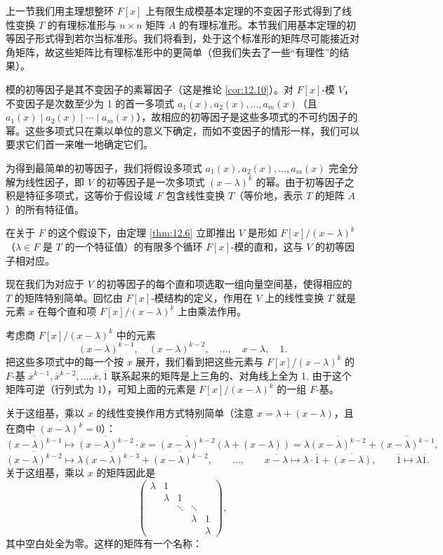 上一节我们用主理想整环 \(F[x]\) 上有限生成模基本定理的不变因子形式得到了线性变换 \(T\) 的有理标准形与 \(n \times n\) 矩阵 \(A\) 的有理标准形。本节我们用基本定理的初等因子形式得到若尔当标准形。我们将看到，处于这个标准形的矩阵尽可能接近对角矩阵，故这些矩阵比有理标准形中的更简单（但我们失去了一些“有理性”的结果）。

模的初等因子是其不变因子的素幂因子（这是推论 \ref{cor:12.10}）。对 \(F[x]\)-模 \(V\)，不变因子是次数至少为 1 的首一多项式 \(a_1(x), a_2(x), \ldots, a_m(x)\)（且 \(a_1(x) \mid a_2(x) \mid \cdots \mid a_m(x)\)），故相应的初等因子是这些多项式的不可约因子的幂。这些多项式只在乘以单位的意义下确定，而如不变因子的情形一样，我们可以要求它们首一来唯一地确定它们。

为得到最简单的初等因子，我们将假设多项式 \(a_1(x), a_2(x), \ldots, a_m(x)\) 完全分解为线性因子，即 \(V\) 的初等因子是一次多项式 \((x-\lambda)^k\) 的幂。由于初等因子之积是特征多项式，这等价于假设域 \(F\) 包含线性变换 \(T\)（等价地，表示 \(T\) 的矩阵 \(A\)）的所有特征值。

在关于 \(F\) 的这个假设下，由定理 \ref{thm:12.6} 立即推出 \(V\) 是形如 \(F[x]/(x-\lambda)^k\)（\(\lambda \in F\) 是 \(T\) 的一个特征值）的有限多个循环 \(F[x]\)-模的直和，这与 \(V\) 的初等因子相对应。

现在我们为对应于 \(V\) 的初等因子的每个直和项选取一组向量空间基，使得相应的 \(T\) 的矩阵特别简单。回忆由 \(F[x]\)-模结构的定义，作用在 \(V\) 上的线性变换 \(T\) 就是元素 \(x\) 在每个直和项 \(F[x]/(x-\lambda)^k\) 上由乘法作用。

考虑商 \(F[x]/(x-\lambda)^k\) 中的元素
\[
(x-\lambda)^{k-1}, \quad (x-\lambda)^{k-2}, \quad \ldots, \quad x-\lambda, \quad 1.
\]
把这些多项式中的每一个按 \(x\) 展开，我们看到把这些元素与 \(F[x]/(x-\lambda)^k\) 的 \(F\)-基 \(\overline{x}^{k-1}, \overline{x}^{k-2}, \ldots, \overline{x}, \overline{1}\) 联系起来的矩阵是上三角的、对角线上全为 1. 由于这个矩阵可逆（行列式为 1），可知上面的元素是 \(F[x]/(x-\lambda)^k\) 的一组 \(F\)-基。

关于这组基，乘以 \(x\) 的线性变换作用方式特别简单（注意 \(x = \lambda+(x-\lambda)\)，且在商中 \(\overline{(x-\lambda)^k} = 0\)）：
\[
\overline{(x-\lambda)^{k-1}} \mapsto \overline{(x-\lambda)^{k-2}}\cdot\overline{x} = \overline{(x-\lambda)^{k-2}}(\lambda+(x-\lambda)) = \lambda\overline{(x-\lambda)^{k-2}}+\overline{(x-\lambda)^{k-1}},
\]
\[
\overline{(x-\lambda)^{k-2}} \mapsto \lambda\overline{(x-\lambda)^{k-3}}+\overline{(x-\lambda)^{k-2}}, \qquad \ldots, \qquad \overline{x-\lambda} \mapsto \lambda \cdot \overline{1}+\overline{(x-\lambda)}, \qquad \overline{1} \mapsto \lambda\overline{1}.
\]
关于这组基，乘以 \(x\) 的矩阵因此是
\[
\begin{pmatrix}
\lambda & 1 & & & \\
& \lambda & 1 & & \\
& & \ddots & \ddots & \\
& & & \lambda & 1\\
& & & & \lambda
\end{pmatrix},
\]
其中空白处全为零。这样的矩阵有一个名称：

